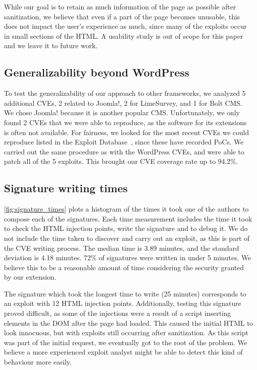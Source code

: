 While our goal is to retain as much information of the page as
possible after sanitization, we believe that even if a part of the
page becomes unusable, this does not impact the user's experience as
much, since many of the exploits occur in small sections of the
HTML. A usability study is out of scope for this paper and we leave it
to future work.


\subsection{Generalizability beyond WordPress}
\label{generalizability}

To test the generalizability of our approach to other frameworks, we
analyzed 5 additional CVEs, 2 related to Joomla!, 2 for LimeSurvey,
and 1 for Bolt CMS.  We chose Joomla! because it is another
popular \ac{CMS}. Unfortunately, we only found 2 CVEs
that we were able to reproduce, as the software for its extensions is
often not available. For fairness, we looked for the most recent CVEs
we could reproduce listed in the Exploit Database~\cite{exploitdb}, since
these have recorded \acp{PoC}. We carried out the same
procedure as with the WordPress CVEs, and were able to patch all of
the 5 exploits. This brought our CVE coverage rate up to 94.2\%.

\subsection{Signature writing times} \label{signature_times}

\autoref{fig:signature_times} plots a histogram of the times it took
one of the authors to compose each of the signatures. Each time
measurement includes the time it took to check the HTML injection
points, write the signature and to debug it. We do not include the
time taken to discover and carry out an exploit, as this is part of
the CVE writing process. The median time is 3.89 minutes, and the
standard deviation is 4.18 minutes. 72\% of signatures were written in
under 5 minutes. We believe this to be a reasonable amount of time
considering the security granted by our extension.

The signature which took the longest time to write (25 minutes)
corresponds to an exploit with 12 HTML injection points. Additionally,
testing this signature proved difficult, as some of
the injections were a result of a script inserting elements in the DOM
after the page had loaded. This caused the initial HTML to look
innocuous, but with exploits still occurring after sanitization. As
this script was part of the initial request, we eventually got to the
root of the problem. We believe a more experienced exploit analyst
might be able to detect this kind of behaviour more
easily. %

